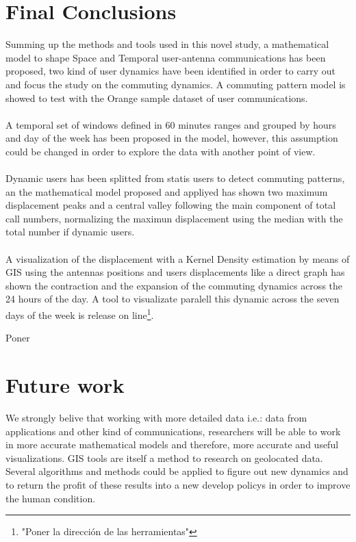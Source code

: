 \newpage
\section{Final Conclusions}

Summing up the methods and tools used in this novel study, a mathematical model to shape Space and Temporal user-antenna communications has been proposed, two kind of user dynamics have been identified in order to carry out and focus the study on the commuting dynamics. A commuting pattern model is showed to test with the Orange sample dataset of user communications.
\\
\\
A temporal set of windows defined in 60 minutes ranges and grouped by hours and day of the week has been proposed in the model, however, this assumption could be changed in order to explore the data with another point of view.
\\
\\
Dynamic users has been splitted from statis users to detect commuting patterns, an the mathematical model proposed and appliyed has shown two maximum displacement peaks and a central valley following the main component of total call numbers, normalizing the maximun displacement using the median with the total number if dynamic users.
\\
\\
A visualization of the displacement with a Kernel Density estimation by means of GIS using the antennas positions and users displacements like a direct graph has shown the contraction and the expansion of the commuting dynamics across the 24 hours of the day.  A tool to visualizate paralell this dynamic  across the seven days of the week is release on line\footnote{"Poner la dirección de las herramientas"}.

{\color{red} Poner }



\section{Future work}

We strongly belive that working with more detailed data i.e.: data from applications and other kind of communications, researchers will be able to work in more accurate mathematical models and therefore, more accurate and useful visualizations. GIS tools are itself a method to research on geolocated data. Several algorithms and methods could be applied to figure out new dynamics and to return the profit of these results into a new develop policys in order to improve the human condition.
